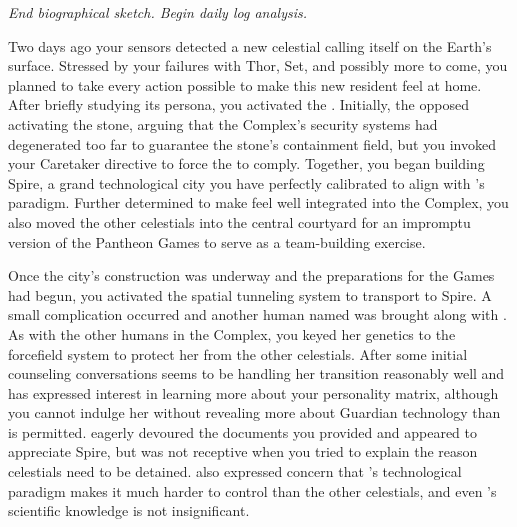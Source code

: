 \documentclass[char]{guardians}
\begin{document}

\emph{End biographical sketch. Begin daily log analysis.}

Two days ago your sensors detected a new celestial calling itself \cUnity{} on the Earth's surface. Stressed by your failures with Thor, Set, and possibly more to come, you planned to take every action possible to make this new resident feel at home. After briefly studying its persona, you activated the \stone{}. Initially, the \cWarden{} opposed activating the stone, arguing that the Complex's security systems had degenerated too far to guarantee the stone's containment field, but you invoked your Caretaker directive to force the \cWarden{} to comply. Together, you began building Spire, a grand technological city you have perfectly calibrated to align with \cUnity{}'s paradigm. Further determined to make \cUnity{} feel well integrated into the Complex, you also moved the other celestials into the central courtyard for an impromptu version of the Pantheon Games to serve as a team-building exercise.

Once the city's construction was underway and the preparations for the Games had begun, you activated the spatial tunneling system to transport \cUnity{} to Spire. A small complication occurred and another human named \cKachiko{\intro} was brought along with \cUnity{}. As with the other humans in the Complex, you keyed her genetics to the forcefield system to protect her from the other celestials. After some initial counseling conversations \cKachiko{} seems to be handling her transition reasonably well and has expressed interest in learning more about your personality matrix, although you cannot indulge her without revealing more about Guardian technology than is permitted. \cUnity{} eagerly devoured the documents you provided and appeared to appreciate Spire, but was not receptive when you tried to explain the reason celestials need to be detained. \cWarden{} also expressed concern that \cUnity{}'s technological paradigm makes it much harder to control than the other celestials, and even \cKachiko{}'s scientific knowledge is not insignificant.
\end{document}
